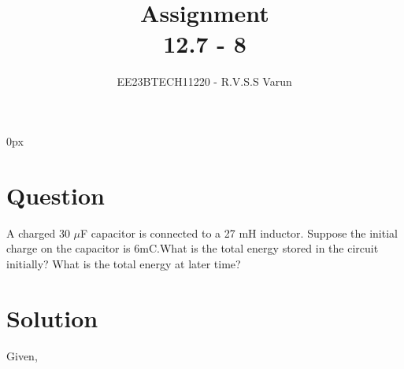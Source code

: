 \documentclass[beamer]{IEEEtran}
\theoremstyle{remark}
\begin{document}
\parindent 0px


\title{Assignment\\[1ex]12.7 - 8}
\author{EE23BTECH11220 - R.V.S.S Varun$^{}$%
}
\maketitle
\newpage
\bigskip

\renewcommand{\thefigure}{\theenumi}
\renewcommand{\thetable}{\theenumi}
\section*{Question}
A charged 30 $\mu$F capacitor is connected to a 27 mH inductor. Suppose the initial charge on the capacitor is 6mC.What is the total energy stored in the circuit initially? What is the
total energy at later time?
\section*{Solution}
Given,
\end{document}
